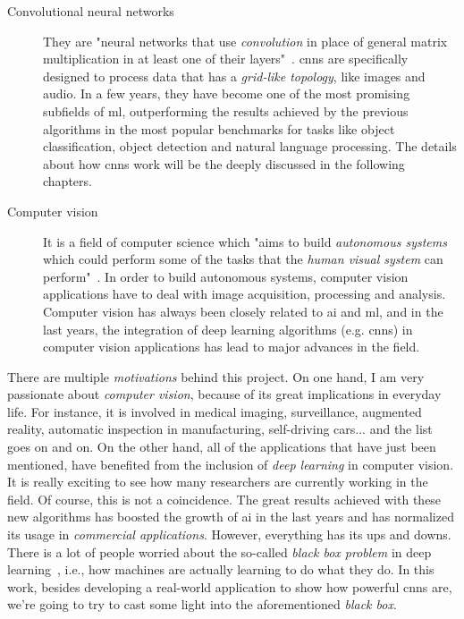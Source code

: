 \begin{description}
	\item[Convolutional neural networks] They are "neural networks that use \emph{convolution} in place of general matrix multiplication in at least one of their layers"~\cite{Goodfellow-et-al-2016}. \glspl{cnn} are specifically designed to process data that has a \emph{grid-like topology}, like images and audio. In a few years, they have become one of the most promising subfields of \gls{ml}, outperforming the results achieved by the previous algorithms in the most popular benchmarks for tasks like object classification, object detection and natural language processing. The details about how \glspl{cnn} work will be the deeply discussed in the following chapters.
\end{description}

\begin{description}
	\item[Computer vision] It is a field of computer science which "aims to build \emph{autonomous systems} which could perform some of the tasks that the \emph{human visual system} can perform"~\cite{huang1996computer}. In order to build autonomous systems, computer vision applications have to deal with image acquisition, processing and analysis. Computer vision has always been closely related to \gls{ai} and \gls{ml}, and in the last years, the integration of deep learning algorithms (e.g. \glspl{cnn}) in computer vision applications has lead to major advances in the field.
\end{description}

There are multiple \emph{motivations} behind this project. On one hand, I am very passionate about \emph{computer vision}, because of its great implications in everyday life. For instance, it is involved in medical imaging, surveillance, augmented reality, automatic inspection in manufacturing, self-driving cars... and the list goes on and on. On the other hand, all of the applications that have just been mentioned, have benefited from the inclusion of \emph{deep learning} in computer vision. It is really exciting to see how many researchers are currently working in the field. Of course, this is not a coincidence. The great results achieved with these new algorithms has boosted the growth of \gls{ai} in the last years and has normalized its usage in \emph{commercial applications}. However, everything has its ups and downs. There is a lot of people worried about the so-called \emph{\textit{black box} problem} in deep learning~\cite{black-box}, i.e., how machines are actually learning to do what they do. In this work, besides developing a real-world application to show how powerful \glspl{cnn} are, we're going to try to cast some light into the aforementioned \textit{black box}. 

